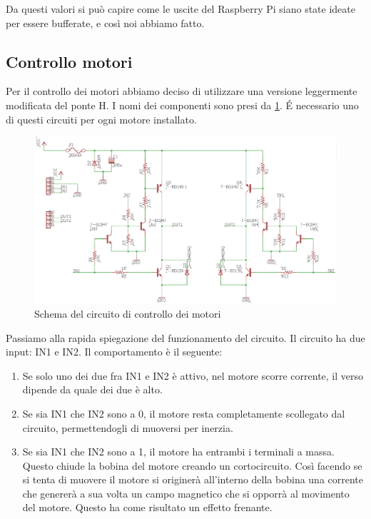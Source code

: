 \documentclass[12pt]{article}
\newcommand{\raspi}{Raspberry Pi}
\begin{document}
Da questi valori si può capire come le uscite del \raspi{} siano state ideate per essere bufferate, e così noi abbiamo fatto.

\subsection{Controllo motori}
Per il controllo dei motori abbiamo deciso di utilizzare una versione leggermente modificata del ponte H. I nomi dei componenti sono presi da \cref{fig:ponteH}. \'E necessario uno di questi circuiti per ogni motore installato.

\begin{figure}[h]
\includegraphics[width=\textwidth]{SchemaH}
\centering
\caption{Schema del circuito di controllo dei motori}
\label{fig:ponteH}
\end{figure}

Passiamo alla rapida spiegazione del funzionamento del circuito. Il circuito ha due input: IN1 e IN2. Il comportamento è il seguente:
\begin{enumerate}
\item Se solo uno dei due fra IN1 e IN2 è attivo, nel motore scorre corrente, il verso dipende da quale dei due è alto.
\item Se sia IN1 che IN2 sono a 0, il motore resta completamente scollegato dal circuito, permettendogli di muoversi per inerzia.
\item Se sia IN1 che IN2 sono a 1, il motore ha entrambi i terminali a massa. Questo chiude la bobina del motore creando un cortocircuito. Così facendo se si tenta di muovere il motore si originerà all'interno della bobina una corrente che genererà a sua volta un campo magnetico che si opporrà al movimento del motore. Questo ha come risultato un effetto frenante. 
\end{enumerate}
\end{document}
